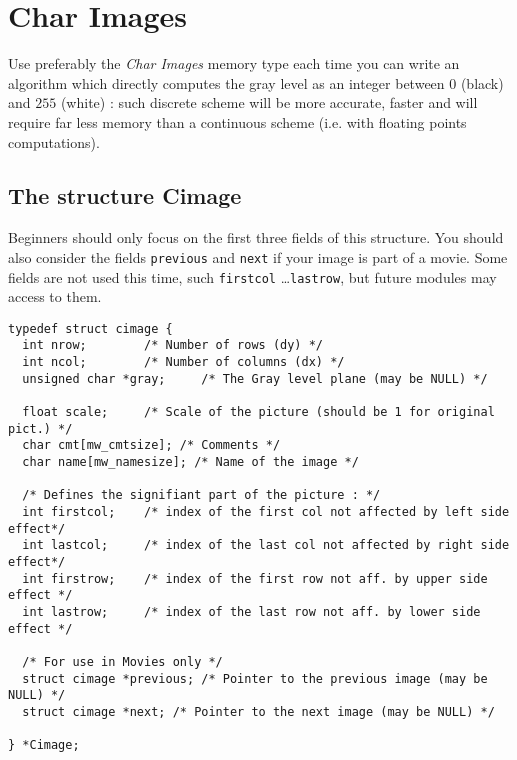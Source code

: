 \section{Char Images}

\label{images_char-images}

Use preferably the {\em Char Images} memory type each time you can write an algorithm which directly computes the gray level as an integer between $0$ (black) and $255$ (white) : such discrete scheme will be more accurate, faster and will require far less memory than a continuous scheme (i.e. with floating points computations).

\subsection{The structure Cimage}
\label{images_char-images_structure}

\def\cimage{{\tt Cimage }}
\index{structure!\cimage}

 Beginners should only focus on the first three fields of this structure. 
You should also consider the fields \verb+previous+ and \verb+next+ if your
image is part of a movie.
Some fields are not used this time, such \verb+firstcol+ \ldots \verb+lastrow+,
but future modules may access to them.

{\small
\begin{verbatim}
typedef struct cimage {
  int nrow;        /* Number of rows (dy) */
  int ncol;        /* Number of columns (dx) */
  unsigned char *gray;     /* The Gray level plane (may be NULL) */

  float scale;     /* Scale of the picture (should be 1 for original pict.) */
  char cmt[mw_cmtsize]; /* Comments */
  char name[mw_namesize]; /* Name of the image */
  
  /* Defines the signifiant part of the picture : */
  int firstcol;    /* index of the first col not affected by left side effect*/
  int lastcol;     /* index of the last col not affected by right side effect*/
  int firstrow;    /* index of the first row not aff. by upper side effect */  
  int lastrow;     /* index of the last row not aff. by lower side effect */  

  /* For use in Movies only */
  struct cimage *previous; /* Pointer to the previous image (may be NULL) */
  struct cimage *next; /* Pointer to the next image (may be NULL) */

} *Cimage;
\end{verbatim}
}


